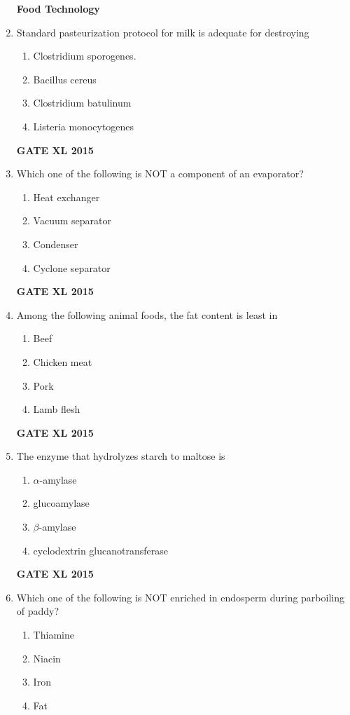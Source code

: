 \documentclass[journal,12pt,onecolumn]{IEEEtran}
\begin{document}
\begin{enumerate}
	\textbf{Food Technology}
\item Standard pasteurization protocol for milk is adequate for destroying
    \begin{enumerate}
            \item Clostridium sporogenes.
	    \item Bacillus cereus
	    \item Clostridium batulinum
            \item Listeria monocytogenes
    \end{enumerate}
\hfill{\textbf{GATE XL 2015}}
\item Which one of the following is NOT a component of an evaporator?
    \begin{enumerate}
            \item Heat exchanger
	    \item  Vacuum separator
	    \item Condenser
            \item Cyclone separator
    \end{enumerate}
\hfill{\textbf{GATE XL 2015}}
\item Among the following animal foods, the fat content is least in
    \begin{enumerate}
            \item Beef
	    \item Chicken meat
	    \item Pork
            \item Lamb flesh
    \end{enumerate}
\hfill{\textbf{GATE XL 2015}}
\item The enzyme that hydrolyzes starch to maltose is
    \begin{enumerate}
            \item $\alpha$-amylase
	    \item glucoamylase
	    \item $\beta$-amylase
            \item cyclodextrin glucanotransferase
    \end{enumerate}
\hfill{\textbf{GATE XL 2015}}
\item Which one of the following is NOT enriched in endosperm during parboiling of paddy?
    \begin{enumerate}
            \item Thiamine
	    \item Niacin
	    \item Iron
            \item Fat

\end{enumerate}
\end{enumerate}
\end{document}

